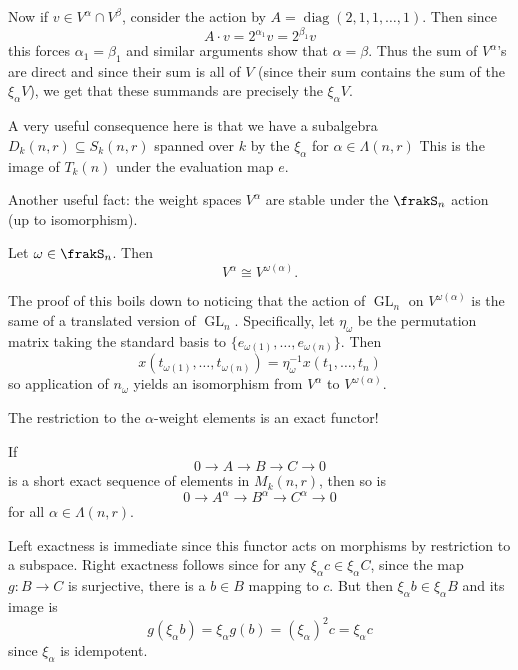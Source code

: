 \documentclass[12pt]{article}
\DeclareMathOperator{\1}{\mathbbm{1}}
\DeclareMathOperator{\GL}{GL}
\begin{document}
{\begin{prf}
	Now if $v\in V^\alpha\cap V^\beta$, consider the action by $A=\operatorname{diag}(2,1,1,\dots,1)$. Then since 
	\[A\cdot v=2^{\alpha_1}v=2^{\beta_1}v\]
	this forces $\alpha_1=\beta_1$ and similar arguments show that $\alpha=\beta$. Thus the sum of $V^\alpha$'s are direct and since their sum is all of $V$ (since their sum 
	contains the sum of the $\xi_\alpha V$), we get that these summands are precisely the $\xi_\alpha V$.
\end{prf}
\begin{rmk}
	A very useful consequence here is that we have a subalgebra $D_k(n,r)\subseteq S_k(n,r)$ spanned over $k$ by the $\xi_\alpha$ for $\alpha\in\Lambda(n,r)$
	This is the image of $T_k(n)$ under the evaluation map $e$.
\end{rmk}

Another useful fact: the weight spaces $V^\alpha$ are stable under the $\frakS_n$ action (up to isomorphism).
\begin{prop}\label{prop:dom-weight-dimension}
	Let $\omega\in\frakS_n$. Then 
	\[V^\alpha\cong V^{\omega(\alpha)}.\]
\end{prop}
\begin{prf}
	The proof of this boils down to noticing that the action of $\GL_n$ on $V^{\omega(\alpha)}$ is the same of a translated 
	version of $\GL_n$. Specifically, let $\eta_\omega$ be the permutation matrix taking the standard basis to $\{e_{\omega(1)},\dots,e_{\omega(n)}\}$.
	Then 
	\[x(t_{\omega(1)},\dots,t_{\omega(n)})=\eta_\omega^{-1}x(t_1,\dots,t_n)\]
	so application of $n_\omega$ yields an isomorphism from $V^\alpha$ to $V^{\omega(\alpha)}$.
\end{prf}
The restriction to the $\alpha$-weight elements is an exact functor!
\begin{prop}\label{prop:xi-exact}
	If 
	\[0\to A\to B\to C\to 0\]
	is a short exact sequence of elements in $M_k(n,r)$, then so is 
	\[0\to A^\alpha\to B^\alpha\to C^\alpha\to 0\]
	for all $\alpha\in\Lambda(n,r)$.
\end{prop}
\begin{prf}
	Left exactness is immediate since this functor acts on morphisms by restriction to a subspace. Right exactness follows since for 
	any $\xi_\alpha c\in\xi_\alpha C$, since the map $g:B\to C$ is surjective, there is a $b\in B$ mapping to $c$. But then 
	$\xi_\alpha b\in\xi_\alpha B$ and its image is 
	\[g(\xi_\alpha b)=\xi_\alpha g(b)=(\xi_\alpha)^2c=\xi_\alpha c\]
	since $\xi_\alpha$ is idempotent.
\end{prf}

}
\end{document}
